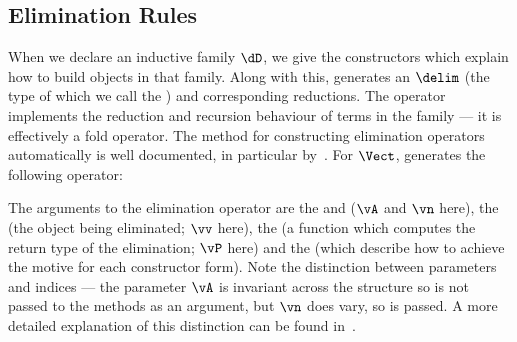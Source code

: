 \subsection{Elimination Rules}

\label{elimops}

When we declare an inductive family $\dD$, we give the constructors
which explain how to build objects in that family. Along with this,
\Ivor{} generates an  $\delim$ (the
type of which we call the ) and corresponding
reductions. The operator implements the reduction and recursion
behaviour of terms in the family --- it is effectively a fold
operator.  The method for constructing elimination operators
automatically is well documented, in particular
by~\cite{dybjer94,luo94,mcbride-thesis}.  For $\Vect$, \Ivor{} generates the
following operator:


The arguments to the elimination operator are the 
and  ($\vA$ and $\vn$ here), the  (the
object being eliminated; $\vv$ here), the  (a function
which computes the return type of the elimination; $\vP$ here) and the
 (which describe how to achieve the motive for each
constructor form).  Note the distinction between parameters and
indices --- the parameter $\vA$ is invariant across the structure so
is not passed to the methods as an argument, but $\vn$ does vary, so
is passed. A more detailed explanation of this distinction can be
found in~\cite{luo94,brady-thesis}.

